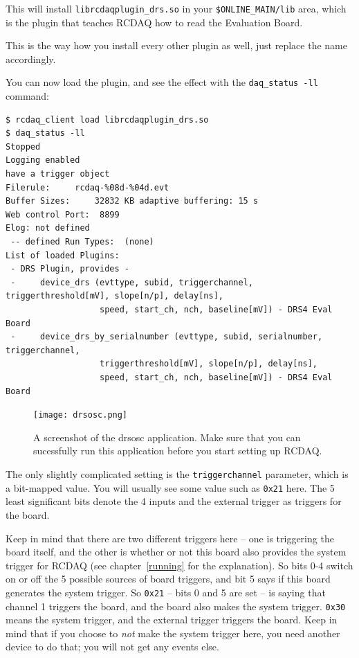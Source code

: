 \documentclass{article}[11pt]
\begin{document}
This will install \verb|librcdaqplugin_drs.so| in your
\verb|$ONLINE_MAIN/lib| area, which is the plugin that teaches RCDAQ how
to read the Evaluation Board.

This is the way how you install every other plugin as well, just
replace the name accordingly.

You can now load the plugin, and see the effect with the
\verb|daq_status -ll| command:

{\footnotesize 
\begin{verbatim}
$ rcdaq_client load librcdaqplugin_drs.so
$ daq_status -ll
Stopped
Logging enabled
have a trigger object
Filerule:     rcdaq-%08d-%04d.evt
Buffer Sizes:     32832 KB adaptive buffering: 15 s
Web control Port:  8899
Elog: not defined
 -- defined Run Types:  (none)
List of loaded Plugins:
 - DRS Plugin, provides -
 -     device_drs (evttype, subid, triggerchannel, triggerthreshold[mV], slope[n/p], delay[ns], 
                   speed, start_ch, nch, baseline[mV]) - DRS4 Eval Board
 -     device_drs_by_serialnumber (evttype, subid, serialnumber, triggerchannel, 
                   triggerthreshold[mV], slope[n/p], delay[ns], 
                   speed, start_ch, nch, baseline[mV]) - DRS4 Eval Board
\end{verbatim}
}

\begin{figure}
  \centering
  \texttt{[image: drsosc.png]}
  \caption{\label{drsosc}A screenshot of the drsosc application. Make
    sure that you can sucessfully run this application before you
    start setting up RCDAQ.}
\end{figure}

The only slightly complicated setting is the \verb|triggerchannel|
parameter, which is a bit-mapped value. You will usually see some
value such as \verb|0x21| here. The 5 least significant bits denote
the 4 inputs and the external trigger as triggers for the board.

Keep in mind that there are two different triggers here -- one is
triggering the board itself, and the other is whether or not this
board also provides the system trigger for RCDAQ (see
chapter~\ref{running} for the explanation). So bits 0-4 switch on or
off the 5 possible sources of board triggers, and bit 5 says if this
board generates the system trigger. So \verb|0x21| -- bits 0 and 5 are
set -- is saying that channel 1 triggers the board, and the board also
makes the system trigger. \verb|0x30| means the system trigger, and
the external trigger triggers the board. Keep in mind that if you
choose to \emph{not} make the system trigger here, you need another
device to do that; you will not get any events else.
\end{document}
